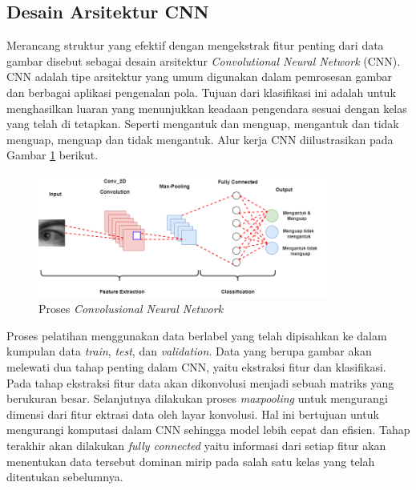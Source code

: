 \subsection{Desain Arsitektur CNN}

    Merancang struktur yang efektif dengan mengekstrak fitur penting dari data gambar disebut sebagai desain 
    arsitektur \textit{Convolutional Neural Network} (CNN). CNN adalah tipe arsitektur yang umum digunakan dalam 
    pemrosesan gambar dan berbagai aplikasi pengenalan pola. Tujuan dari klasifikasi ini adalah untuk menghasilkan 
    luaran yang menunjukkan keadaan pengendara sesuai dengan kelas yang telah di tetapkan. Seperti mengantuk dan
     menguap, mengantuk dan tidak menguap, menguap dan tidak mengantuk.  Alur kerja CNN diilustrasikan pada Gambar \ref{Proses Convolusional Neural Network} berikut.
 
     \begin{figure}[H]
      \centering
      \includegraphics[width=0.85\textwidth]{figures/bab3/cnn_arsitektur.png}
      \caption{Proses \textit{Convolusional Neural Network}}
      \label{Proses Convolusional Neural Network}
    
      \medskip %
      \begin{minipage}{0.8\textwidth}
        \centering

      \end{minipage}
    \end{figure}

    

    Proses pelatihan menggunakan data berlabel yang telah dipisahkan ke dalam kumpulan data \textit{train}, \textit{test}, 
    dan \textit{validation}. Data yang berupa gambar akan melewati dua tahap penting dalam CNN, yaitu ekstraksi fitur dan 
    klasifikasi. Pada tahap ekstraksi fitur data akan dikonvolusi menjadi sebuah matriks yang berukuran besar. Selanjutnya 
    dilakukan proses \textit{maxpooling} untuk mengurangi dimensi dari fitur ektrasi data oleh layar konvolusi. Hal ini bertujuan untuk mengurangi komputasi dalam CNN
    sehingga model lebih cepat dan efisien. Tahap terakhir akan dilakukan \textit{fully connected} yaitu informasi dari setiap fitur akan menentukan data tersebut dominan mirip pada salah satu kelas yang telah ditentukan sebelumnya.
    
